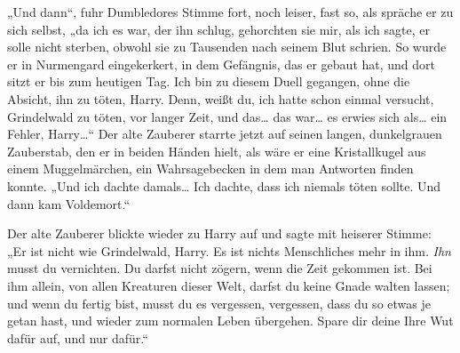 „Und dann“, fuhr Dumbledores Stimme fort, noch leiser, fast so, als spräche er zu sich selbst, „da ich es war, der ihn schlug, gehorchten sie mir, als ich sagte, er solle nicht sterben, obwohl sie zu Tausenden nach seinem Blut schrien. So wurde er in Nurmengard eingekerkert, in dem Gefängnis, das er gebaut hat, und dort sitzt er bis zum heutigen Tag. Ich bin zu diesem Duell gegangen, ohne die Absicht, ihn zu töten, Harry. Denn, weißt du, ich hatte schon einmal versucht, Grindelwald zu töten, vor langer Zeit, und das… das war… es erwies sich als… ein Fehler, Harry…“ Der alte Zauberer starrte jetzt auf seinen langen, dunkelgrauen Zauberstab, den er in beiden Händen hielt, als wäre er eine Kristallkugel aus einem Muggelmärchen, ein Wahrsagebecken in dem man Antworten finden konnte. „Und ich dachte damals… Ich dachte, dass ich niemals töten sollte. Und dann kam Voldemort.“

Der alte Zauberer blickte wieder zu Harry auf und sagte mit heiserer Stimme: „Er ist nicht wie Grindelwald, Harry. Es ist nichts Menschliches mehr in ihm. \emph{Ihn} musst du vernichten. Du darfst nicht zögern, wenn die Zeit gekommen ist. Bei ihm allein, von allen Kreaturen dieser Welt, darfst du keine Gnade walten lassen; und wenn du fertig bist, musst du es vergessen, vergessen, dass du so etwas je getan hast, und wieder zum normalen Leben übergehen. Spare dir deine Ihre Wut dafür auf, und nur dafür.“

